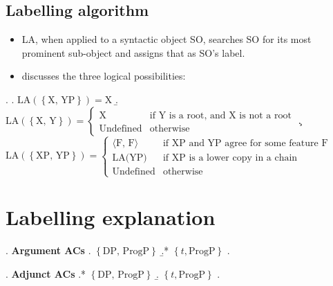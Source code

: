 \documentclass[letterpaper]{article}
\begin{document}
\subsection{Labelling algorithm}
\begin{itemize}
  \item LA, when applied to a syntactic object SO, searches SO for its most prominent sub-object and assigns that as SO's label.
  \item \textcite{chomsky2013problems,chomsky2013problems} discusses the three logical possibilities:
\end{itemize}
\ex.
\a. $\text{LA}(\left\{ \text{X, YP} \right\}) = \text{X}$
\b. $\text{LA}(\left\{ \text{X, Y} \right\}) = 
	\begin{cases}
	  \text{X} & \text{if Y is a root, and X is not a root}\\
	  \text{Undefined} & \text{otherwise}
	\end{cases}
	$
\c. $\text{LA}(\left\{ \text{XP, YP} \right\}) = 
	\begin{cases}
	  \langle\text{F, F}\rangle & \text{if XP and YP agree for some feature F}\\
	  \text{LA(YP)} & \text{if XP is a lower copy in a chain}\\
	  \text{Undefined} & \text{otherwise}
	\end{cases}
	$

\section{Labelling explanation}
\begin{minipage}[t]{0.35\textwidth}
  \ex. \textbf{Argument ACs}
  \a. $\left\{ \text{DP, ProgP} \right\}$
  \b.* $\left\{ t, \text{ProgP} \right\}$
  \z.

\end{minipage}
\begin{minipage}[t]{0.35\textwidth}
  \ex. \textbf{Adjunct ACs}
  \a.* $\left\{ \text{DP, ProgP} \right\}$
  \b. $\left\{ t, \text{ProgP} \right\}$
  \z.

\end{minipage}
\end{document}
